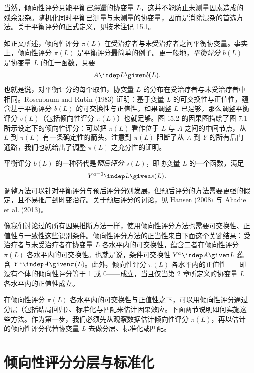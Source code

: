 当然，倾向性评分只能平衡\emph{已测量}的协变量 $L$，这并不能防止未测量因素造成的残余混杂。随机化同时平衡已测量与未测量的协变量，因而是消除混杂的首选方法。关于平衡评分的正式定义，见技术注记 15.1。

\begin{techpoint}[平衡评分与预后评分]
如正文所述，倾向性评分 $\pi(L)$ 在受治疗者与未受治疗者之间平衡协变量。事实上，倾向性评分 $\pi(L)$ 是平衡评分最简单的例子。更一般地，\emph{平衡评分} $b(L)$ 是协变量 $L$ 的任一函数，只要
\[
A\indep L\given b(L).
\]
也就是说，对平衡评分的每个取值，协变量 $L$ 的分布在受治疗者与未受治疗者中相同。Rosenbaum and Rubin (1983) 证明：基于变量 $L$ 的可交换性与正值性，蕴含基于平衡评分 $b(L)$ 的可交换性与正值性。如果调整 $L$ 已足够，那么调整平衡评分 $b(L)$（包括倾向性评分 $\pi(L)$）也就足够。图 15.2 的因果图描绘了图 7.1 所示设定下的倾向性评分：可以把 $\pi(L)$ 看作位于 $L$ 与 $A$ 之间的中间节点，从 $L$ 到 $\pi(L)$ 有一条确定性的箭头。注意到 $\pi(L)$ 阻断了从 $A$ 到 $Y$ 的所有后门通路，我们也就给出了调整 $\pi(L)$ 之充分性的证明。

平衡评分 $b(L)$ 的一种替代是\emph{预后评分} $s(L)$，即协变量 $L$ 的一个函数，满足
\[
Y^{a=0}\indep L\given s(L).
\]
调整方法可以针对平衡评分与预后评分分别发展，但预后评分的方法需要更强的假定，且不易推广到时变治疗。关于预后评分的讨论，见 Hansen (2008) 与 Abadie et al. (2013)。
\end{techpoint}

像我们讨论过的所有因果推断方法一样，使用倾向性评分方法也需要可交换性、正值性与一致性这些识别条件。倾向性评分方法的正当性来自下面这个关键结果：受治疗者与未受治疗者在协变量 $L$ 各水平内的可交换性，蕴含二者在倾向性评分 $\pi(L)$ 各水平内的可交换性。也就是说，条件可交换性 $Y^a\indep A\given L$ 蕴含 $Y^a\indep A\given\pi(L)$。此外，倾向性评分 $\pi(L)$ 各水平内的正值性——即没有个体的倾向性评分等于 1 或 0——成立，当且仅当第 2 章所定义的协变量 $L$ 各水平内的正值性成立。

在倾向性评分 $\pi(L)$ 各水平内的可交换性与正值性之下，可以用倾向性评分通过分层（包括结局回归）、标准化与匹配来估计因果效应。下面两节说明如何实施这些方法。作为第一步，我们必须先从观察数据估计倾向性评分 $\pi(L)$，再以估计的倾向性评分代替协变量 $L$ 去做分层、标准化或匹配。

\section{倾向性评分分层与标准化}

